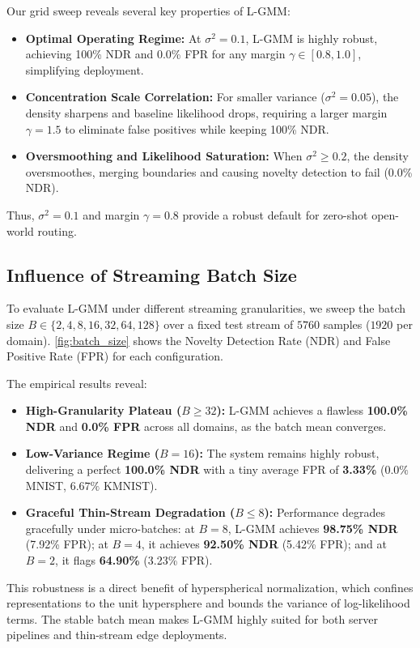 \documentclass{article}
\theoremstyle{plain}
\theoremstyle{definition}
\theoremstyle{remark}
\begin{document}
Our grid sweep reveals several key properties of L-GMM:
\vspace{-4pt}
\begin{itemize}\itemsep=0pt \parsep=0pt
    \item \textbf{Optimal Operating Regime:} At $\sigma^2 = 0.1$, L-GMM is highly robust, achieving 100\% NDR and 0.0\% FPR for any margin $\gamma \in [0.8, 1.0]$, simplifying deployment.
    \item \textbf{Concentration Scale Correlation:} For smaller variance ($\sigma^2 = 0.05$), the density sharpens and baseline likelihood drops, requiring a larger margin $\gamma = 1.5$ to eliminate false positives while keeping 100\% NDR.
    \item \textbf{Oversmoothing and Likelihood Saturation:} When $\sigma^2 \ge 0.2$, the density oversmoothes, merging boundaries and causing novelty detection to fail (0.0\% NDR).
\end{itemize}\vspace{-4pt}
Thus, $\sigma^2 = 0.1$ and margin $\gamma = 0.8$ provide a robust default for zero-shot open-world routing.

\subsection{Influence of Streaming Batch Size}
\label{sec:batch_size}

To evaluate L-GMM under different streaming granularities, we sweep the batch size $B \in \{2, 4, 8, 16, 32, 64, 128\}$ over a fixed test stream of $5760$ samples ($1920$ per domain). \cref{fig:batch_size} shows the Novelty Detection Rate (NDR) and False Positive Rate (FPR) for each configuration.

The empirical results reveal:
\vspace{-4pt}
\begin{itemize}\itemsep=0pt \parsep=0pt
    \item \textbf{High-Granularity Plateau ($B \ge 32$):} L-GMM achieves a flawless \textbf{100.0\% NDR} and \textbf{0.0\% FPR} across all domains, as the batch mean converges.
    \item \textbf{Low-Variance Regime ($B = 16$):} The system remains highly robust, delivering a perfect \textbf{100.0\% NDR} with a tiny average FPR of \textbf{3.33\%} ($0.0\%$ MNIST, $6.67\%$ KMNIST).
    \item \textbf{Graceful Thin-Stream Degradation ($B \le 8$):} Performance degrades gracefully under micro-batches: at $B=8$, L-GMM achieves \textbf{98.75\% NDR} (7.92\% FPR); at $B=4$, it achieves \textbf{92.50\% NDR} (5.42\% FPR); and at $B=2$, it flags \textbf{64.90\%} (3.23\% FPR).
\end{itemize}\vspace{-4pt}
This robustness is a direct benefit of hyperspherical normalization, which confines representations to the unit hypersphere and bounds the variance of log-likelihood terms. The stable batch mean makes L-GMM highly suited for both server pipelines and thin-stream edge deployments.
\end{document}
